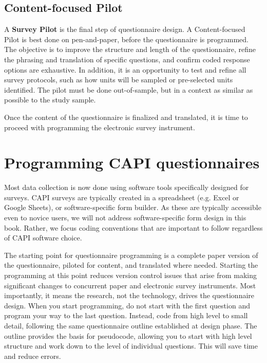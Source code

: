 \subsection{Content-focused Pilot}
A \textbf{Survey Pilot}  is the final step of questionnaire design. 
A Content-focused Pilot   is best done on pen-and-paper, before the questionnaire is programmed. 
The objective is to improve the structure and length of the questionnaire, refine the phrasing and translation of specific questions, and confirm coded response options are exhaustive. 
In addition, it is an opportunity to test and refine all survey protocols, such as how units will be sampled or pre-selected units identified. The pilot must be done out-of-sample, but in a context as similar as possible to the study sample.

Once the content of the questionnaire is finalized and translated, it is time to proceed with programming the electronic survey instrument.



\section{Programming CAPI questionnaires}
Most data collection is now done using software tools specifically designed for surveys. CAPI surveys 
are typically created in a spreadsheet (e.g. Excel or Google Sheets), or software-specific form builder. 
As these are typically accessible even to novice users, we will not address software-specific form design in this book. Rather, we focus coding conventions that are important to follow regardless of CAPI software choice. 

The starting point for questionnaire programming is a complete paper version of the questionnaire, piloted for content, and translated where needed. Starting the programming at this point reduces version control issues that arise from making significant changes to concurrent paper and electronic survey instruments. Most importantly, it means the research, not the technology, drives the questionnaire design. When you start programming, do not start with the first question and program your way to the last question. Instead, code from high level to small detail, following the same questionnaire outline established at design phase. The outline provides the basis for pseudocode, allowing you to start with high level structure and work down to the level of individual questions. This will save time and reduce errors. 

